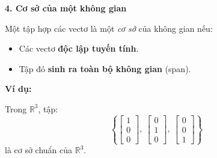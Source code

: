 \documentclass[12pt]{article}
\begin{document}
\textbf{4. Cơ sở của một không gian}

Một tập hợp các vectơ là một \textit{cơ sở} của không gian nếu:
\begin{itemize}
    \item Các vectơ \textbf{độc lập tuyến tính}.
    \item Tập đó \textbf{sinh ra toàn bộ không gian} (span).
\end{itemize}

\textbf{Ví dụ:}

Trong \( \mathbb{R}^3 \), tập:
\[
\left\{ \begin{bmatrix} 1 \\ 0 \\ 0 \end{bmatrix},\ 
\begin{bmatrix} 0 \\ 1 \\ 0 \end{bmatrix},\ 
\begin{bmatrix} 0 \\ 0 \\ 1 \end{bmatrix} \right\}
\]
là cơ sở chuẩn của \( \mathbb{R}^3 \).
\end{document}
